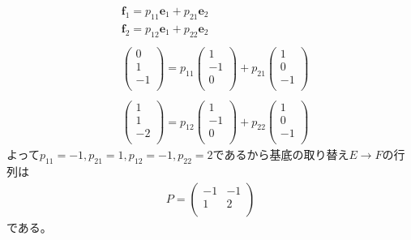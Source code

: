 \documentclass[dvipdfmx,uplatex,11pt]{jsarticle}
\begin{document}
\begin{eqnarray*}
& \bm{f}_1=p_{11}\bm{e}_1+p_{21}\bm{e}_2 \\
& \bm{f}_2=p_{12}\bm{e}_1+p_{22}\bm{e}_2 \\ \\
&
\begin{pmatrix}
0 \\
1 \\
-1 \\
\end{pmatrix}
=
p_{11}
\begin{pmatrix}
1 \\
-1 \\
0 \\
\end{pmatrix}
+p_{21}
\begin{pmatrix}
1 \\
0 \\
-1 \\
\end{pmatrix}
\\ \\
&
\begin{pmatrix}
1 \\
1 \\
-2 \\
\end{pmatrix}
=
p_{12}
\begin{pmatrix}
1 \\
-1 \\
0 \\
\end{pmatrix}
+p_{22}
\begin{pmatrix}
1 \\
0 \\
-1 \\
\end{pmatrix}
\end{eqnarray*}
よって$p_{11}=-1,p_{21}=1,p_{12}=-1,p_{22}=2$であるから基底の取り替え$E→F$の行列は
\begin{eqnarray*}
P=
\begin{pmatrix}
-1 & -1 \\
1 & 2 \\
\end{pmatrix}
\end{eqnarray*}
である。
%
%
%
\newpage
%
%
%
\end{document}
